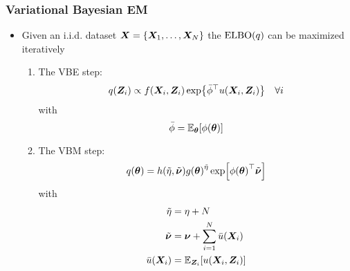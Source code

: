 \documentclass[10pt, compress, notheorems, aspectratio=169]{beamer}
\let\originalleft\left
\let\originalright\right
\renewcommand{\left}{\mathopen{}\mathclose \bgroup \originalleft}
\renewcommand{\right}{\aftergroup \egroup \originalright}
\newcommand{\E}{\mathbb{E}}
\begin{document}
\begin{frame}
	\frametitle{Variational Bayesian EM}
	\begin{itemize}
		\item Given an i.i.d. dataset ${\bm X} = \left\{ {\bm X}_1, \ldots, {\bm X}_N \right\}$ the $\text{ELBO} \left( q \right)$ can be maximized iteratively
			\begin{enumerate}
				\item The VBE step:
					\begin{equation}
						q \left( {\bm Z}_i \right) \propto f \left( {\bm X}_i, {\bm Z}_i \right) \exp \left\{ \bar{\phi}^{\top} u \left( {\bm X}_i, {\bm Z}_i \right) \right\} \quad \forall i
					\end{equation}
					with 
					\begin{equation*}
						\bar{\phi} = \E_{\bm \theta} \left[ \phi \left( {\bm \theta} \right) \right]
					\end{equation*}
				\item The VBM step:
					\begin{equation}
						q \left( {\bm \theta} \right) = h \left( \tilde{\eta}, \tilde{\bm \nu} \right) g \left( {\bm \theta} \right)^{\tilde{\eta}} \exp \left[ \phi \left( {\bm \theta} \right)^{\top} \tilde{\bm \nu} \right]
					\end{equation}
					with
					\begin{align*}
						\tilde{\eta} &= \eta + N \\
						\tilde{\bm \nu} &= {\bm \nu} + \sum_{i = 1}^N \bar{u} \left( {\bm X}_i \right) \\
						\bar{u} \left( {\bm X}_i \right) &= \E_{{\bm Z}_i} \left[ u \left( {\bm X}_i, {\bm Z}_i \right) \right]
					\end{align*}
			\end{enumerate}
	\end{itemize}
\end{frame}
\end{document}
